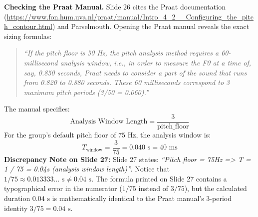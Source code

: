 \documentclass[11pt,a4paper]{article}
\begin{document}
\textbf{Checking the Praat Manual.} Slide 26 cites the Praat documentation (\url{https://www.fon.hum.uva.nl/praat/manual/Intro_4_2__Configuring_the_pitch_contour.html}) and Parselmouth. Opening the Praat manual reveals the exact sizing formulas:
\begin{quote}
\textit{``If the pitch floor is 50 Hz, the pitch analysis method requires a 60-millisecond analysis window, i.e., in order to measure the F0 at a time of, say, 0.850 seconds, Praat needs to consider a part of the sound that runs from 0.820 to 0.880 seconds. These 60 milliseconds correspond to 3 maximum pitch periods (3/50 = 0.060).''}
\end{quote}
The manual specifies:
\begin{equation}
\text{Analysis Window Length} = \frac{3}{\text{pitch\_floor}}
\end{equation}
For the group's default pitch floor of $75\text{ Hz}$, the analysis window is:
\begin{equation}
T_{\text{window}} = \frac{3}{75} = 0.040\text{ s} = 40\text{ ms}
\end{equation}
\textbf{Discrepancy Note on Slide 27:} Slide 27 states: \textit{``Pitch floor = 75Hz => T = 1 / 75 = 0.04s (analysis window length)''}. Notice that $1 / 75 \approx 0.013333\dots\text{ s} \ne 0.04\text{ s}$. The formula printed on Slide 27 contains a typographical error in the numerator ($1/75$ instead of $3/75$), but the calculated duration $0.04\text{ s}$ is mathematically identical to the Praat manual's 3-period identity $3/75 = 0.04\text{ s}$.
\end{document}
